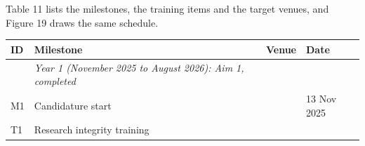 \documentclass[
  11pt,
]{article}
\begin{document}
Table 11 lists the milestones, the training items and the target venues,
and Figure 19 draws the same schedule.

\begin{longtable}[]{@{}llll@{}}
\toprule
\begin{minipage}[b]{0.06\columnwidth}\raggedright
ID\strut
\end{minipage} & \begin{minipage}[b]{0.49\columnwidth}\raggedright
Milestone\strut
\end{minipage} & \begin{minipage}[b]{0.19\columnwidth}\raggedright
Venue\strut
\end{minipage} & \begin{minipage}[b]{0.15\columnwidth}\raggedright
Date\strut
\end{minipage}\tabularnewline
\midrule
\endhead
\begin{minipage}[t]{0.06\columnwidth}\raggedright
\strut
\end{minipage} & \begin{minipage}[t]{0.49\columnwidth}\raggedright
\emph{Year 1 (November 2025 to August 2026): Aim 1, completed}\strut
\end{minipage} & \begin{minipage}[t]{0.19\columnwidth}\raggedright
\strut
\end{minipage} & \begin{minipage}[t]{0.15\columnwidth}\raggedright
\strut
\end{minipage}\tabularnewline
\begin{minipage}[t]{0.06\columnwidth}\raggedright
M1\strut
\end{minipage} & \begin{minipage}[t]{0.49\columnwidth}\raggedright
Candidature start\strut
\end{minipage} & \begin{minipage}[t]{0.19\columnwidth}\raggedright
\strut
\end{minipage} & \begin{minipage}[t]{0.15\columnwidth}\raggedright
13 Nov 2025\strut
\end{minipage}\tabularnewline
\begin{minipage}[t]{0.06\columnwidth}\raggedright
T1\strut
\end{minipage} & \begin{minipage}[t]{0.49\columnwidth}\raggedright
Research integrity training\strut
\end{minipage} & \begin{minipage}[t]{0.19\columnwidth}\raggedright

\end{minipage}
\end{longtable}
\end{document}

